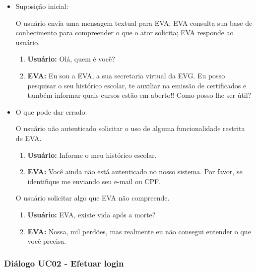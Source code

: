 \begin{itemize}
    \item Suposição inicial:
    
    O usuário envia uma mensagem textual para EVA; EVA consulta sua base de conhecimento para compreender o que o ator solicita; EVA responde ao usuário.
    
    \begin{enumerate}
        \item \textbf{Usuário:} Olá, quem é você?
        \item \textbf{EVA:} Eu sou a EVA, a sua secretaria virtual da EVG. Eu posso pesquisar o seu histórico escolar, te auxiliar na emissão de certificados e também informar quais cursos estão em aberto!! Como posso lhe ser útil?
    \end{enumerate}
    
    \item O que pode dar errado:
    
    O usuário não autenticado solicitar o uso de alguma funcionalidade restrita de EVA.
    
        \begin{enumerate}
            \item \textbf{Usuário:} Informe o meu histórico escolar.
            \item \textbf{EVA:} Você ainda não está autenticado no nosso sistema. Por favor, se identifique me enviando seu e-mail ou CPF.
        \end{enumerate}
    
    O usuário solicitar algo que EVA não compreende.
    
        \begin{enumerate}
            \item \textbf{Usuário:} EVA, existe vida após a morte?
            \item \textbf{EVA:} Nossa, mil perdões, mas realmente eu não consegui entender o que você precisa.
        \end{enumerate}
\end{itemize}

\subsubsection{Diálogo UC02 - Efetuar login}

